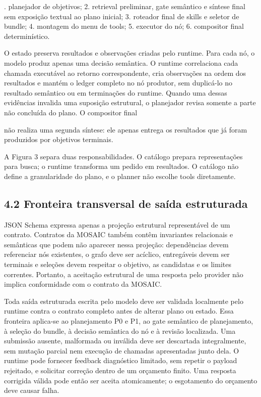 \documentclass[12pt,a4paper]{article}
\begin{document}
. planejador de objetivos; 2. retrieval preliminar, gate semântico e síntese final sem exposição textual ao plano inicial; 3. roteador final de skills e seletor de bundle; 4. montagem do menu de tools; 5. executor do nó; 6. compositor final determinístico.\par

O estado preserva resultados e observações criadas pelo runtime. Para cada nó, o modelo produz apenas uma decisão semântica. O runtime correlaciona cada chamada executável ao retorno correspondente, cria observações na ordem dos resultados e mantém o ledger completo no nó produtor, sem duplicá-lo no resultado semântico ou em terminações do runtime. Quando uma dessas evidências invalida uma suposição estrutural, o planejador revisa somente a parte não concluída do plano. O compositor final



não realiza uma segunda síntese: ele apenas entrega os resultados que já foram produzidos por objetivos terminais.




A Figura 3 separa duas responsabilidades. O catálogo prepara representações para busca; o runtime transforma um pedido em resultados. O catálogo não define a granularidade do plano, e o planner não escolhe tools diretamente.



\subsection*{4.2 Fronteira transversal de saída estruturada}

JSON Schema expressa apenas a projeção estrutural representável de um contrato. Contratos da MOSAIC também contêm invariantes relacionais e semânticas que podem não aparecer nessa projeção: dependências devem referenciar nós existentes, o grafo deve ser acíclico, entregáveis devem ser terminais e seleções devem respeitar o objetivo, as candidatas e os limites correntes. Portanto, a aceitação estrutural de uma resposta pelo provider não implica conformidade com o contrato da MOSAIC.

Toda saída estruturada escrita pelo modelo deve ser validada localmente pelo runtime contra o contrato completo antes de alterar plano ou estado. Essa fronteira aplica-se ao planejamento P0 e P1, ao gate semântico de planejamento, à seleção do bundle, à decisão semântica do nó e à revisão localizada. Uma submissão ausente, malformada ou inválida deve ser descartada integralmente, sem mutação parcial nem execução de chamadas apresentadas junto dela. O runtime pode fornecer feedback diagnóstico limitado, sem repetir o payload rejeitado, e solicitar correção dentro de um orçamento finito. Uma resposta corrigida válida pode então ser aceita atomicamente; o esgotamento do orçamento deve causar falha.
\end{document}
